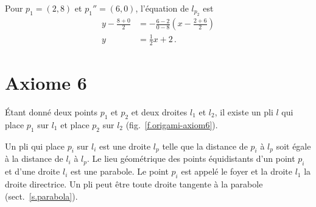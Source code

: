 \begin{example}
Pour $p_1=(2,8)$ et $p_1''=(6,0)$, l'équation de  $l_{p_2}$ est
%
\begin{align*}
y-\frac{8+0}{2}&=-\frac{6-2}{0-8}\left(x-\frac{2+6}{2}\right)\\
y&=\frac{1}{2}x+2\,.
\end{align*}
\end{example}




\section{Axiome 6}\label{s.ax6}

\begin{axiom}
Étant donné deux points $p_1$ et $p_2$ et deux droites $l_1$ et $l_2$, il existe un pli $l$ qui place $p_1$ sur $l_1$ et place $p_2$ sur $l_2$ (fig.~\ref{f.origami-axiom6}).
\end{axiom}

Un pli qui place $p_i$ sur $l_i$ est une droite $l_p$ telle que la distance de $p_i$ à $l_p$ soit égale à la distance de $l_i$ à $l_p$. Le lieu géométrique des points équidistants d'un point $p_i$ et d'une droite $l_i$ est une parabole. Le point $p_i$ est appelé le foyer et la droite $l_1$ la droite directrice. Un pli peut être toute droite tangente à la parabole 
 (sect.~\ref{s.parabola}).

